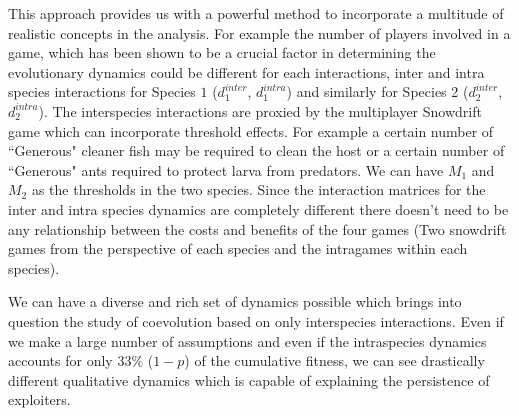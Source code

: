 \documentclass[12pt]{article}
\begin{document}
This approach provides us with a powerful method to incorporate a multitude of realistic concepts in the analysis.
For example the number of players involved in a game, which has been shown to be a crucial factor in determining the evolutionary dynamics could be different for each interactions, inter and intra species interactions for Species $1$ ($d^{inter}_1$, $d^{intra}_1$) and similarly for Species 2 ($d^{inter}_2$, $d^{intra}_2$). 
The interspecies interactions are proxied by the multiplayer Snowdrift game which can incorporate threshold effects.
For example a certain number of ``Generous" cleaner fish may be required to clean the host or a certain number of ``Generous" ants required to protect larva from predators.
We can have $M_1$ and $M_2$ as the thresholds in the two species.
Since the interaction matrices for the inter and intra species dynamics are completely different there doesn't need to be any relationship between the costs and benefits of the four games (Two snowdrift games from the perspective of each species and the intragames within each species).

We can have a diverse and rich set of dynamics possible which brings into question the study of coevolution based on only interspecies interactions. Even if we make a large number of assumptions and even if the intraspecies dynamics accounts for only $33\%$ ($1-p$) of the cumulative fitness, we can see drastically different qualitative dynamics which is capable of explaining the persistence of exploiters.
\end{document}

